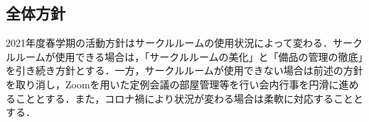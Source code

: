 \subsection*{全体方針}


2021年度春学期の活動方針はサークルルームの使用状況によって変わる．サークルルームが使用できる場合は，「サークルルームの美化」と「備品の管理の徹底」を引き続き方針とする．一方，サークルルームが使用できない場合は前述の方針を取り消し，Zoomを用いた定例会議の部屋管理等を行い会内行事を円滑に進めることとする．また，コロナ禍により状況が変わる場合は柔軟に対応することとする．
